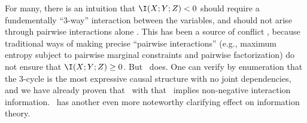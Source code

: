 For many, there is an
intuition that
$\I(X;Y;Z) < 0$
should require
a fundementally ``3-way'' interaction between the variables,
and should not arise through pairwise interactions alone \cite{dit-stumble}.
This has been a source of conflict 
\cite{williams2010nonnegative,mackay2003information,1219753,CoverThomas},
%
because traditional ways of making 
precise ``pairwise interactions'' 
(e.g., maximum entropy subject to pairwise marginal constraints 
and pairwise factorization)
 do not ensure that $\I(X;Y;Z) \ge 0$. 
But \scibility\ does. 
One can verify by enumeration that the 3-cycle is the most expressive causal structure with no joint dependencies, 
and we have already proven that \scibility\ with that \hgraph\ 
implies non-negative interaction information.
\Scibility\ has another even more noteworthy clarifying effect on information theory. 


